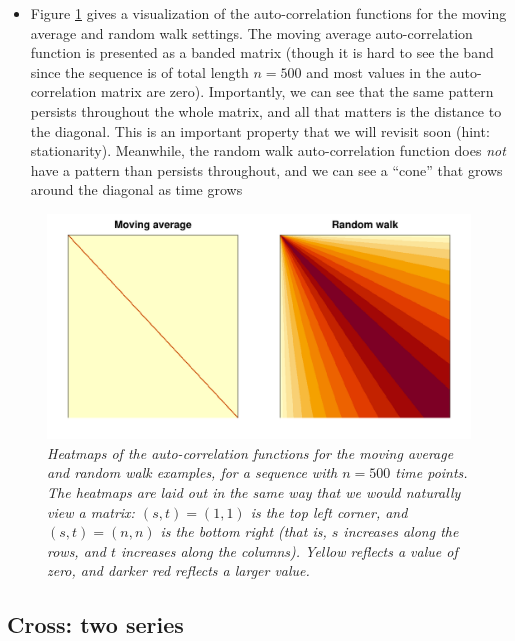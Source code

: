 \documentclass{article}
\begin{document}
\begin{itemize}
\item Figure \ref{fig:heatmap} gives a visualization of the auto-correlation
  functions for the moving average and random walk settings. The moving average
  auto-correlation function is presented as a banded matrix (though it is hard
  to see the band since the sequence is of total length $n=500$ and most values
  in the auto-correlation matrix are zero). Importantly, we can see that the
  same pattern persists throughout the whole matrix, and all that matters is the 
  distance to the diagonal. This is an important property that we will revisit
  soon (hint: stationarity). Meanwhile, the random walk auto-correlation
  function does \emph{not} have a pattern than persists throughout, and we can
  see a ``cone'' that grows around the diagonal as time grows
\end{itemize}

\begin{figure}[htb]
\centering
\includegraphics[width=\textwidth]{fig/heatmap-1.pdf}
\caption{\it Heatmaps of the auto-correlation functions for the moving average 
  and random walk examples, for a sequence with $n=500$ time points. The  
  heatmaps are laid out in the same way that we would naturally view a matrix:
  $(s,t) = (1,1)$ is the top left corner, and $(s,t) = (n,n)$ is the bottom
  right (that is, $s$ increases along the rows, and $t$ increases along the
  columns). Yellow reflects a value of zero, and darker red reflects a larger
  value.} 
\label{fig:heatmap}
\end{figure}

\subsection{Cross: two series}
\end{document}
